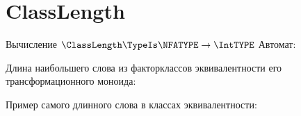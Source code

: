 \section{ClassLength}
\begin{frame}{Вычисление $\ClassLength\TypeIs\NFATYPE\to\IntTYPE$}
	Автомат:


	Длина наибольшего слова из факторклассов эквивалентности его трансформационного моноида:

	Пример самого длинного слова в классах эквивалентности:


\end{frame}

